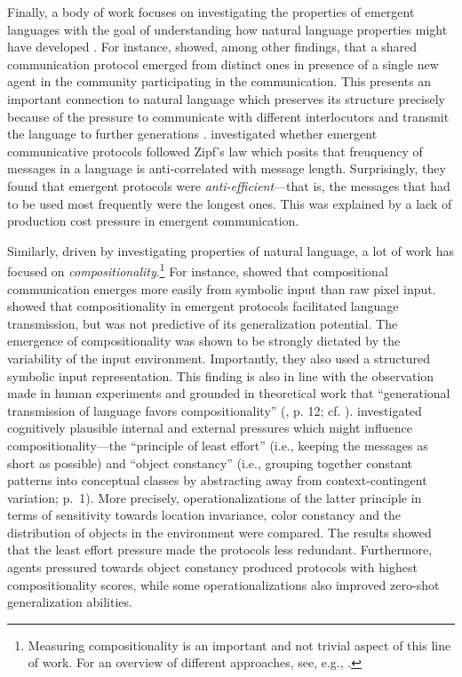 Finally, a body of work focuses on investigating the properties of emergent languages with the goal of understanding how natural language properties might have developed \parencite{lazaridou2020emergent}. For instance, \cite{graesser2019emergent} showed, among other findings, that a shared communication protocol emerged from distinct ones in presence of a single new agent in the community participating in the communication. This presents an important connection to natural language which preserves its structure precisely because of the pressure to communicate with different interlocutors and transmit the language to further generations \parencite{tomasello2010origins}. \cite{chaabouni2019anti} investigated whether emergent communicative protocols followed Zipf's law which posits that freuquency of messages in a language is anti-correlated with message length. Surprisingly, they found that emergent protocols were \textit{anti-efficient}---that is, the messages that had to be used most frequently were the longest ones. This was explained by a lack of production cost pressure in emergent communication.

Similarly, driven by investigating properties of natural language, a lot of work has focused on \textit{compositionality}.\footnote{Measuring compositionality is an important and not trivial aspect of this line of work. For an overview of different approaches, see, e.g., \cite{lazaridou2020emergent}.} For instance, \cite{lazaridou2018emergence} showed that compositional communication emerges more easily from symbolic input than raw pixel input. 
\cite{chaabouni2020compositionality} showed that compositionality in emergent protocols facilitated language transmission, but was not predictive of its generalization potential. The emergence of compositionality was shown to be strongly dictated by the variability of the input environment. Importantly, they also used a structured symbolic input representation.
This finding is also in line with the observation made in human experiments and grounded in theoretical work that ``generational transmission of language favors compositionality'' (\cite{lazaridou2020emergent}, p. 12; cf. \cite{kirby2014iterated}).
\cite{luna2020internal} investigated cognitively plausible internal and external pressures which might influence compositionality---the ``principle of least effort'' (i.e., keeping the messages as short as possible) and ``object constancy'' (i.e., grouping together constant patterns into conceptual classes by abstracting away from context-contingent variation; p.~1). More precisely, operationalizations of the latter principle in terms of sensitivity towards location invariance, color constancy and the distribution of objects in the environment were compared. The results showed that the least effort pressure made the protocols less redundant. Furthermore, agents pressured towards object constancy produced protocols with highest compositionality scores, while some operationalizations also improved zero-shot generalization abilities. 

